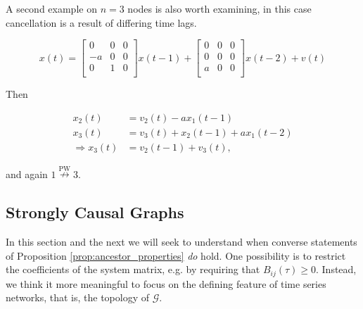 \documentclass[12pt]{article}
\def\pwgc{\overset{\text{PW}}{\rightarrow}}  %
\def\npwgc{\overset{\text{PW}}{\nrightarrow}}  %
\def\gcg{\mathcal{G}}  %
\begin{document}
\begin{example}
  \label{ex:lag_cancellation}
  A second example on $n = 3$ nodes is also worth examining, in this case
  cancellation is a result of differing time lags.

\begin{equation*}
  x(t) =
  \left[
    \begin{array}{ccc}
      0 & 0 & 0\\
      -a & 0 & 0\\
      0 & 1 & 0\\
    \end{array}
  \right] x(t - 1) +
  \left[
    \begin{array}{ccc}
      0 & 0 & 0\\
      0 & 0 & 0\\
      a & 0 & 0\\
    \end{array}
  \right] x(t - 2) + v(t)
\end{equation*}

Then

\begin{align*}
  x_2(t) &= v_2(t) - ax_1(t - 1)\\
  x_3(t) &= v_3(t) + x_2(t - 1) + ax_1(t - 2)\\
  \Rightarrow x_3(t) &= v_2(t - 1) + v_3(t),
\end{align*}

and again $1 \npwgc 3$.
\end{example}

\subsection{Strongly Causal Graphs}
\label{sec:strongly_causal_graphs}

In this section and the next we will seek to understand when converse
statements of Proposition \ref{prop:ancestor_properties} \textit{do}
hold.  One possibility is to restrict the coefficients of the system
matrix, e.g. by requiring that $B_{ij}(\tau) \ge 0$.  Instead,
we think it more meaningful to focus on the defining feature of
time series networks, that is, the topology of $\gcg$.
\end{document}
